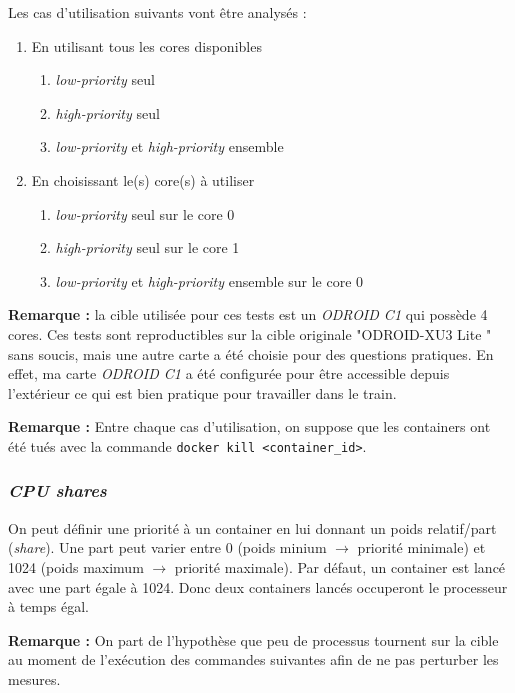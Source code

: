 \documentclass[11pt,a4paper,oneside]{report}
\newcommand{\code}[1]{\texttt{#1}}
\newcommand{\odroid}{ODROID-XU3 Lite }
\begin{document}
Les cas d'utilisation suivants vont être analysés :
\begin{enumerate}
	\item En utilisant tous les cores disponibles
	\begin{enumerate}
		\item \textit{low-priority} seul
		\item \textit{high-priority} seul
		\item \textit{low-priority} et \textit{high-priority} ensemble
	\end{enumerate}

    \item En choisissant le(s) core(s) à utiliser
	\begin{enumerate}
		\item \textit{low-priority} seul sur le core 0
		\item \textit{high-priority} seul sur le core 1
		\item \textit{low-priority} et \textit{high-priority} ensemble sur le core 0
    \end{enumerate}
\end{enumerate}


\textbf{Remarque :} la cible utilisée pour ces tests est un \textit{ODROID C1} qui possède 4 cores. Ces tests sont reproductibles sur la cible originale "\odroid" sans soucis, mais une autre carte a été choisie pour des questions pratiques. En effet, ma carte \textit{ODROID C1} a été configurée pour être accessible depuis l'extérieur ce qui est bien pratique pour travailler dans le train.

\textbf{Remarque :} Entre chaque cas d'utilisation, on suppose que les containers ont été tués avec la commande \code{docker kill <container\_id>}.


\subsubsection{\textit{CPU shares}}
On peut définir une priorité à un container en lui donnant un poids relatif/part (\textit{share}). Une part peut varier entre 0 (poids minium $\to$ priorité minimale) et 1024 (poids maximum $\to$ priorité maximale). Par défaut, un container est lancé avec une part égale à 1024. Donc deux containers lancés occuperont le processeur à temps égal.


\textbf{Remarque :} On part de l'hypothèse que peu de processus tournent sur la cible au moment de l'exécution des commandes suivantes afin de ne pas perturber les mesures.
\end{document}
